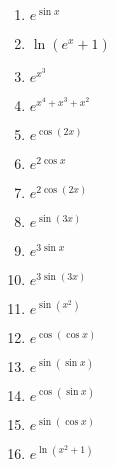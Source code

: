 \documentclass{article}
\begin{document}
\begin{multicols}{3}
\begin{enumerate}
    \item $e^{\sin x}$
    \item $\ln(e^x+1)$
    \item $e^{x^3}$
    \item $e^{x^4+x^3+x^2}$
    \item $e^{\cos(2x)}$
    \item $e^{2\cos x}$
    \item $e^{2\cos(2x)}$
    \item $e^{\sin(3x)}$
    \item $e^{3\sin x}$
    \item $e^{3\sin(3x)}$
    \item $e^{\sin(x^2)}$
    \item $e^{\cos(\cos x)}$
    \item $e^{\sin(\sin x)}$
    \item $e^{\cos(\sin x)}$
    \item $e^{\sin(\cos x)}$
    \item $e^{\ln(x^2+1)}$
\end{enumerate}
\end{multicols}
\end{document}
